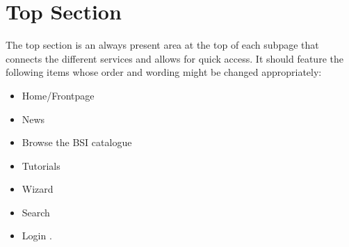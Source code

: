 \section{Top Section} 
\label{top_section}

The top section is an always present area at the top of each subpage that connects the different services and allows for quick access.
It should feature the following items whose order and wording might be changed appropriately:
\begin{itemize}
    \item Home/Frontpage
    \item News
    \item Browse the BSI catalogue
    \item Tutorials
    \item Wizard
    \item Search
    \item Login 
        . 
\end{itemize}



